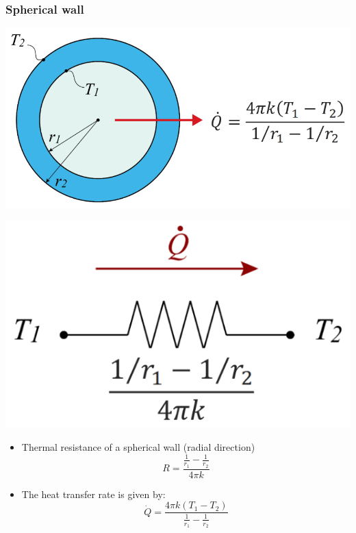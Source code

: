 \documentclass[11pt]{article}
\begin{document}
\subsubsection{Spherical wall}
\label{sec:org7f484f6}
\begin{center}
\includegraphics[scale=1]{./images/thermal-resistance-spherical-wall.png}
\end{center}
\begin{center}
\includegraphics[scale=1]{./images/thermal-resistance-spherical-wall-electrical-analogy.png}
\end{center}
\begin{itemize}
\item Thermal resistance of a spherical wall (radial direction)
\[R = \frac{\frac{1}{r_1} - \frac{1}{r_2}}{4 \pi k}\]
\item The heat transfer rate is given by:
\[\dot{Q} = \frac{4 \pi k (T_1 - T_2)}{\frac{1}{r_1} - \frac{1}{r_2}}\]
\end{itemize}
\end{document}
